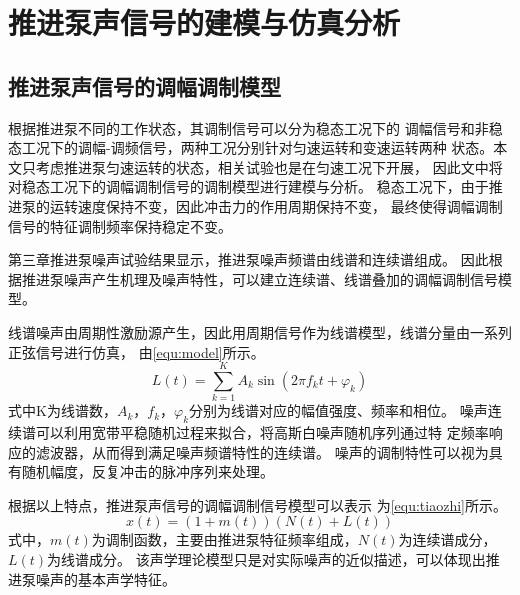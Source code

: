 \section{推进泵声信号的建模与仿真分析}
\subsection{推进泵声信号的调幅调制模型}
根据推进泵不同的工作状态，其调制信号可以分为稳态工况下的
调幅信号和非稳态工况下的调幅-调频信号，两种工况分别针对匀速运转和变速运转两种
状态。本文只考虑推进泵匀速运转的状态，相关试验也是在匀速工况下开展，
因此文中将对稳态工况下的调幅调制信号的调制模型进行建模与分析。 
稳态工况下，由于推进泵的运转速度保持不变，因此冲击力的作用周期保持不变，
最终使得调幅调制信号的特征调制频率保持稳定不变。

第三章推进泵噪声试验结果显示，推进泵噪声频谱由线谱和连续谱组成。
因此根据推进泵噪声产生机理及噪声特性，可以建立连续谱、线谱叠加的调幅调制信号模型。

线谱噪声由周期性激励源产生，因此用周期信号作为线谱模型，线谱分量由一系列正弦信号进行仿真，
由\autoref{equ:model}所示\cite{马徐琨2002,2014Periodic,wen2017}。
\begin{equation}
    \label{equ:model}
    L\left ( t \right ) =\sum_{k=1}^{K} A_k\sin \left ( 2\pi f_kt+\varphi _k \right ) 
\end{equation}
式中K为线谱数，$A_k$，$f_k$，$\varphi_k$分别为线谱对应的幅值强度、频率和相位。
噪声连续谱可以利用宽带平稳随机过程来拟合，将高斯白噪声随机序列通过特
定频率响应的滤波器，从而得到满足噪声频谱特性的连续谱。
噪声的调制特性可以视为具有随机幅度，反复冲击的脉冲序列来处理。

根据以上特点，推进泵声信号的调幅调制信号模型可以表示
为\autoref{equ:tiaozhi}所示\cite{2002An,Tarkan2013PREDICTION,李琴2010舰船辐射噪声建模及仿真模拟器的实现}。
\begin{equation}
    \label{equ:tiaozhi}
    x\left ( t \right ) =\left ( 1+m\left ( t \right )  \right )\left ( N\left ( t \right ) + L\left ( t \right ) \right )  
\end{equation}
式中，$m\left ( t \right )$为调制函数，主要由推进泵特征频率组成，$N\left ( t \right )$为连续谱成分，$L\left ( t \right )$为线谱成分。
该声学理论模型只是对实际噪声的近似描述，可以体现出推进泵噪声的基本声学特征。
\begin{comment}
根据其特点将其构建成具有线谱载波和宽带载波，多组分调制频率的调幅调制信号\cite{Tarkan2013PREDICTION,2002An,李琴2010舰船辐射噪声建模及仿真模拟器的实现}。
信号调幅调制模型如\autoref{equ:tiaozhi}所示。
\begin{equation}
    \label{equ:tiaozhi}
    x\left ( t \right ) =\sum_{i=1}^{k}\left [ A_{i}\cos \left ( 2\pi f_{m,i}t  \right )\left ( B_{i}\cos\left ( 2\pi f_{c,i}t  \right )   \right )+D_{i}\cos\left ( 2\pi f_{n,i}t  \right )v\left ( t \right )      \right ]  
\end{equation}
式中，$A_i$为线谱载波的调制信号的幅值，$f_{m,i}$为调制信号的调制频率，$f_{c,i}$为线谱载波信号的载波频率，
$B_i$为载波信号的幅值，$v\left ( t \right )$为随机平稳信号，$D_i$为随机平稳信号的调制信号的幅值，
$f_{n,i}$为随机平稳信号的调制信号的调制频率。
\end{comment}


